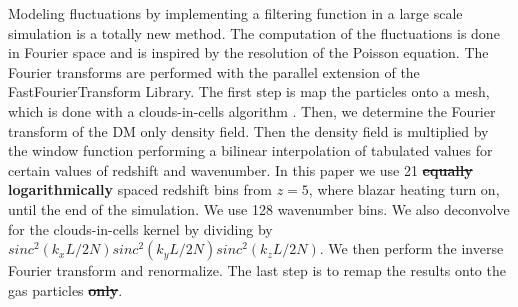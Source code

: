 \documentclass[twocolumns]{emulateapj}
\newcommand\ALc[1]{{\color{red} \bf #1}} %
\begin{document}
{%
Modeling fluctuations by implementing a filtering function in a large scale simulation is a totally new method. The computation of the fluctuations is done in Fourier space and is inspired by the resolution of the Poisson equation. The Fourier transforms are performed with the parallel extension of the FastFourierTransform Library. The first step is map the particles onto a mesh, which is done with a clouds-in-cells algorithm \citep{1981csup.book.....H}. Then, we  determine the Fourier transform of the DM only density field. Then the density field is  multiplied by the window function performing a bilinear interpolation of tabulated values for certain values of redshift and wavenumber. In this paper we use 21 \ALc{\sout{equally} logarithmically} spaced redshift bins from $z=5$, where blazar heating turn on, until the end of the simulation. We use 128 wavenumber bins. We also deconvolve for the clouds-in-cells kernel by dividing by $sinc^2(k_xL/2N)sinc^2(k_yL/2N)sinc^2(k_zL/2N)$. We then perform the inverse Fourier transform and renormalize. The last step is to remap the results onto the gas particles \ALc{\sout{only}}.












}
\end{document}
